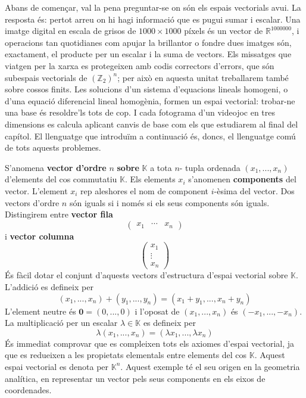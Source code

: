 Abans de començar, val la pena preguntar-se on són els espais vectorials
avui. La resposta és: pertot arreu on hi hagi informació que es pugui sumar
i escalar. Una imatge digital en escala de grisos de $1000\times 1000$
píxels és un vector de $\mathbb{R}^{1000000}$, i operacions tan quotidianes
com apujar la brillantor o fondre dues imatges són, exactament, el producte
per un escalar i la suma de vectors. Els missatges que viatgen per la xarxa
es protegeixen amb codis correctors d'errors, que són subespais vectorials
de $(\mathbb{Z}_{2})^{n}$; per això en aquesta unitat treballarem també
sobre cossos finits. Les solucions d'un sistema d'equacions lineals
homogeni, o d'una equació diferencial lineal homogènia, formen un espai
vectorial: trobar-ne una base és resoldre'ls tots de cop. I cada fotograma
d'un videojoc en tres dimensions es calcula aplicant canvis de base com els
que estudiarem al final del capítol. El llenguatge que introduïm a
continuació és, doncs, el llenguatge comú de tots aquests problemes.

\begin{exemple}
S’anomena \textbf{vector d’ordre} $n$ \textbf{sobre} $\mathbb{K}$ a tota $n$-%
tupla ordenada $(x_{1},...,x_{n})$ d’elements del cos commutatiu $%
\mathbb{K}$. Els elements $x_{i}$ s’anomenen \textbf{components} del
vector. L’element $x_{i}$ rep aleshores el nom de component $i$-èsima del vector. Dos vectors d’ordre $n$ són iguals si i només si
els seus components són iguals. Distingirem entre \textbf{vector fila}%
\begin{equation*}
(%
\begin{array}{ccc}
x_{1} & \cdots & x_{n}%
\end{array}%
)
\end{equation*}%
i \textbf{vector columna}%
\begin{equation*}
\left( 
\begin{array}{c}
x_{1} \\ 
\vdots \\ 
x_{n}%
\end{array}%
\right)
\end{equation*}%
És fàcil dotar el conjunt d’aquests vectors d'estructura d’espai
vectorial sobre $\mathbb{K}$. L'addició es defineix per 
\begin{equation*}
(x_{1},...,x_{n})+(y_{1},...,y_{n})=(x_{1}+y_{1},...,x_{n}+y_{n})
\end{equation*}%
L’element neutre és $\mathbf{0}=(0,...,0)$ i l'oposat de $%
(x_{1},...,x_{n})$ és $(-x_{1},...,-x_{n})$. La multiplicació per un
escalar $\lambda \in \mathbb{K}$ es defineix per%
\begin{equation*}
\lambda (x_{1},...,x_{n})=(\lambda x_{1},...,\lambda x_{n})
\end{equation*}%
És immediat comprovar que es compleixen tots els axiomes d’espai
vectorial, ja que es redueixen a les propietats elementals entre
elements del cos $\mathbb{K}$. Aquest espai vectorial es denota per $%
\mathbb{K}^{n}$. Aquest exemple té el seu origen en la geometria analítica, en representar un vector pels seus components en els eixos de coordenades.
\end{exemple}

